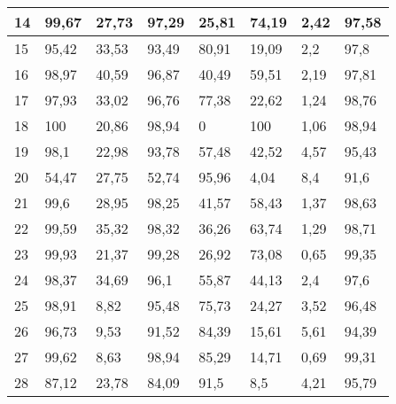 \begin{longtable}[c]{|l|l|l|l|l|l|l|l|}
14              & 99,67        & 27,73        & 97,29       & 25,81         & 74,19         & 2,42          & 97,58         \\ \hline
15              & 95,42        & 33,53        & 93,49       & 80,91         & 19,09         & 2,2           & 97,8          \\ \hline
16              & 98,97        & 40,59        & 96,87       & 40,49         & 59,51         & 2,19          & 97,81         \\ \hline
17              & 97,93        & 33,02        & 96,76       & 77,38         & 22,62         & 1,24          & 98,76         \\ \hline
18              & 100          & 20,86        & 98,94       & 0             & 100           & 1,06          & 98,94         \\ \hline
19              & 98,1         & 22,98        & 93,78       & 57,48         & 42,52         & 4,57          & 95,43         \\ \hline
20              & 54,47        & 27,75        & 52,74       & 95,96         & 4,04          & 8,4           & 91,6          \\ \hline
21              & 99,6         & 28,95        & 98,25       & 41,57         & 58,43         & 1,37          & 98,63         \\ \hline
22              & 99,59        & 35,32        & 98,32       & 36,26         & 63,74         & 1,29          & 98,71         \\ \hline
23              & 99,93        & 21,37        & 99,28       & 26,92         & 73,08         & 0,65          & 99,35         \\ \hline
24              & 98,37        & 34,69        & 96,1        & 55,87         & 44,13         & 2,4           & 97,6          \\ \hline
25              & 98,91        & 8,82         & 95,48       & 75,73         & 24,27         & 3,52          & 96,48         \\ \hline
26              & 96,73        & 9,53         & 91,52       & 84,39         & 15,61         & 5,61          & 94,39         \\ \hline
27              & 99,62        & 8,63         & 98,94       & 85,29         & 14,71         & 0,69          & 99,31         \\ \hline
28              & 87,12        & 23,78        & 84,09       & 91,5          & 8,5           & 4,21          & 95,79         \\ \hline

\end{longtable}
